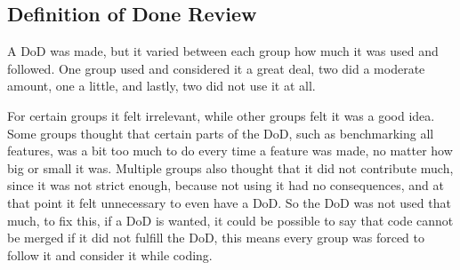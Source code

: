 \subsection{Definition of Done Review}\label{sec:DoDreview}
A DoD was made, but it varied between each group how much it was used and followed.
One group used and considered it a great deal, two did a moderate amount, one a little, and lastly, two did not use it at all.

For certain groups it felt irrelevant, while other groups felt it was a good idea.
Some groups thought that certain parts of the DoD, such as benchmarking all features, was a bit too much to do every time a feature was made, no matter how big or small it was.
Multiple groups also thought that it did not contribute much, since it was not strict enough, because not using it had no consequences, and at that point it felt unnecessary to even have a DoD.
So the DoD was not used that much, to fix this, if a DoD is wanted, it could be possible to say that code cannot be merged if it did not fulfill the DoD, this means every group was forced to follow it and consider it while coding.
